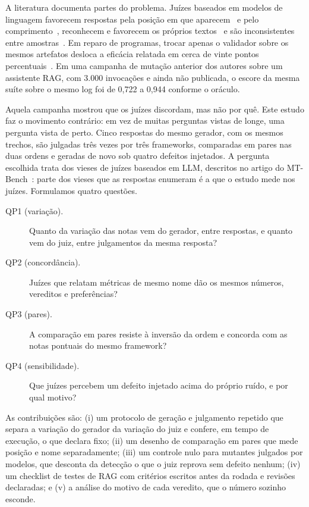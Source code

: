 \documentclass[12pt]{article}
\begin{document}
A literatura documenta partes do problema. Juízes baseados em modelos de
linguagem favorecem respostas pela posição em que
aparecem~\cite{zheng2023judging,wang2024fair,shi2025judging} e pelo
comprimento~\cite{zheng2023judging,saito2023verbosity}, reconhecem e favorecem
os próprios textos~\cite{panickssery2024llm} e são inconsistentes entre
amostras~\cite{stureborg2024inconsistent}. Em reparo de programas, trocar apenas
o validador sobre os mesmos artefatos desloca a eficácia relatada em cerca de
vinte pontos percentuais~\cite{bonfim2026evaluator}. Em uma campanha de mutação
anterior dos autores sobre um assistente RAG, com 3.000 invocações e ainda não
publicada, o escore da mesma suíte sobre o mesmo log foi de 0,722 a 0,944
conforme o oráculo.

Aquela campanha mostrou que os juízes discordam, mas não por quê. Este estudo faz
o movimento contrário: em vez de muitas perguntas vistas de longe, uma pergunta
vista de perto. Cinco respostas do mesmo gerador, com os mesmos trechos, são
julgadas três vezes por três frameworks, comparadas em pares nas duas ordens e
geradas de novo sob quatro defeitos injetados. A pergunta escolhida trata dos
vieses de juízes baseados em LLM, descritos no artigo do
MT-Bench~\cite{zheng2023judging}: parte dos vieses que as respostas enumeram é a
que o estudo mede nos juízes. Formulamos quatro questões.

\begin{description}
\item[QP1 (variação).] Quanto da variação das notas vem do gerador, entre
respostas, e quanto vem do juiz, entre julgamentos da mesma resposta?
\item[QP2 (concordância).] Juízes que relatam métricas de mesmo nome dão os
mesmos números, vereditos e preferências?
\item[QP3 (pares).] A comparação em pares resiste à inversão da ordem e concorda
com as notas pontuais do mesmo framework?
\item[QP4 (sensibilidade).] Que juízes percebem um defeito injetado acima do
próprio ruído, e por qual motivo?
\end{description}

As contribuições são: (i) um protocolo de geração e julgamento repetido que
separa a variação do gerador da variação do juiz e confere, em tempo de
execução, o que declara fixo; (ii) um desenho de comparação em pares que mede
posição e nome separadamente; (iii) um controle nulo para mutantes julgados por
modelos, que desconta da detecção o que o juiz reprova sem defeito nenhum; (iv)
um checklist de testes de RAG com critérios escritos antes da rodada e revisões
declaradas; e (v) a análise do motivo de cada veredito, que o número sozinho
esconde.
\end{document}
